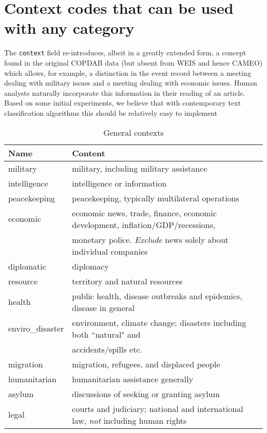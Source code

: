 \documentclass[11pt]{report}
\newcommand{\txt}[1]{\texttt{#1}}
\begin{document}
\section{Context codes that can be used with any category}

The \txt{context} field re-introduces, albeit in a greatly extended form, a concept found in the original COPDAB data (but absent from WEIS and hence CAMEO) which allows, for example, a distinction in the event record between a meeting dealing with military issues and a meeting dealing with economic issues. Human analysts naturally incorporate this information in their reading of an article. Based on some initial experiments, we believe that with contemporary text classification algorithms this should be relatively easy to implement

\begin{table}[htp]
\caption{General contexts }
\begin{center}
\begin{tabular}{|p{}|L{.73\textwidth}|}
\hline
Name & Content \\
\hline
military & military, including military assistance \\
intelligence & intelligence or information \\
peacekeeping & peacekeeping, typically multilateral operations \\
economic & economic news, trade, finance, economic development, inflation/GDP/recessions,\\&\hspace{6pt} monetary police. \emph{Exclude} news solely about individual companies \\
diplomatic & diplomacy \\
resource & territory and natural resources \\
health & public health, disease outbreaks and epidemics, disease in general \\
enviro\_disaster & environment, climate change; disasters including both ``natural" and \\&\hspace{6pt} accidents/spills etc.\\
migration  & migration, refugees, and displaced people \\
humanitarian & humanitarian assistance generally \\
asylum & discussions of seeking or granting asylum \\
legal & courts and judiciary; national and international law, \emph{not} including human rights \\ 

\end{tabular}
\end{center}
\end{table}
\end{document}
